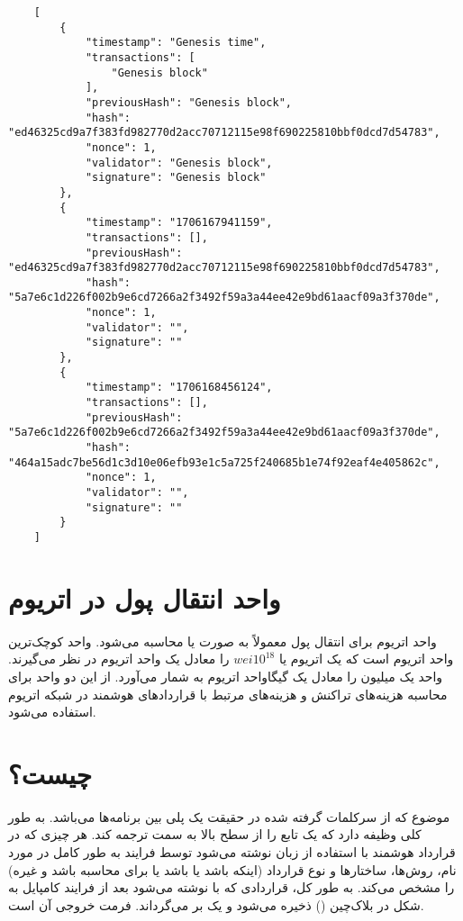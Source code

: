 \documentclass[10pt, a4paper]{article}
\begin{document}
\begin{LTR}
    \begin{lstlisting}
    [
        {
            "timestamp": "Genesis time",
            "transactions": [
                "Genesis block"
            ],
            "previousHash": "Genesis block",
            "hash": "ed46325cd9a7f383fd982770d2acc70712115e98f690225810bbf0dcd7d54783",
            "nonce": 1,
            "validator": "Genesis block",
            "signature": "Genesis block"
        },
        {
            "timestamp": "1706167941159",
            "transactions": [],
            "previousHash": "ed46325cd9a7f383fd982770d2acc70712115e98f690225810bbf0dcd7d54783",
            "hash": "5a7e6c1d226f002b9e6cd7266a2f3492f59a3a44ee42e9bd61aacf09a3f370de",
            "nonce": 1,
            "validator": "",
            "signature": ""
        },
        {
            "timestamp": "1706168456124",
            "transactions": [],
            "previousHash": "5a7e6c1d226f002b9e6cd7266a2f3492f59a3a44ee42e9bd61aacf09a3f370de",
            "hash": "464a15adc7be56d1c3d10e06efb93e1c5a725f240685b1e74f92eaf4e405862c",
            "nonce": 1,
            "validator": "",
            "signature": ""
        }
    ]
    \end{lstlisting}
\end{LTR}

\section{واحد انتقال پول در اتریوم}

واحد اتریوم برای انتقال پول معمولاً به صورت  یا  محاسبه
می‌شود. واحد  کوچک‌ترین واحد اتریوم است که یک اتریوم یا $wei 10^{18}$ را
معادل یک واحد اتریوم در نظر می‌گیرند. واحد  یک میلیون  را معادل
یک گیگاواحد اتریوم به شمار می‌آورد. از این دو واحد برای محاسبه هزینه‌های تراکنش
و هزینه‌های مرتبط با قرارداد‌های هوشمند در شبکه اتریوم استفاده می‌شود.

\section{ چیست؟}

موضوع  که از سرکلمات  گرفته شده در
حقیقت یک پلی بین برنامه‌ها می‌باشد. به طور کلی وظیفه دارد که یک تابع را از سطح
بالا به سمت  ترجمه کند. هر چیزی که در قرارداد هوشمند با استفاده از
زبان  نوشته می‌شود توسط فرایند  به طور کامل در مورد نام،
روش‌ها، ساختار‌ها و نوع قرارداد (اینکه  باشد یا  باشد یا
برای محاسبه  باشد و غیره) را مشخص می‌کند. به طور کل، قراردادی که با
 نوشته می‌شود بعد از فرایند کامپایل به شکل  در
بلاک‌چین () ذخیره می‌شود و یک  بر می‌گرداند. فرمت خروجی
آن  است.
\end{document}
